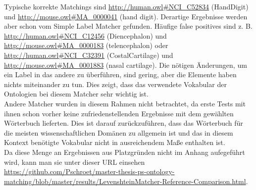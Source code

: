 		Typische korrekte Matchings sind \url{http://human.owl#NCI_C52834}
		(Hand\textunderscore Digit) und
		\url{http://mouse.owl#MA_0000041} (hand digit). Derartige Ergebnisse werden
		aber schon vom Simple Label Matcher gefunden. Häufige false positives sind
		z. B. \url{http://human.owl#NCI_C12456} (Diencephalon) und
		\url{http://mouse.owl#MA_0000183} (telencephalon) oder
		\url{http://human.owl#NCI_C32391} (Costal\textunderscore Cartilage) und
		\url{http://mouse.owl#MA_0001883} (nasal cartilage). Die nötigen Änderungen,
		um ein Label in das andere zu überführen, sind gering, aber die Elemente haben
		nichts miteinander zu tun. Dies zeigt, dass das verwendete Vokabular der
		Ontologien bei diesem Matcher sehr wichtig ist.\\
		Andere Matcher wurden in diesem Rahmen nicht betrachtet, da erste Tests mit
		ihnen schon vorher keine zufriedenstellenden Ergebnisse mit dem gewählten
		Wörterbuch lieferten.
		Dies ist darauf zurückzuführen, dass das Wörterbuch für die meisten
		wissenschaftlichen Domänen zu allgemein ist und das in diesem Kontext
		benötigte Vokabular nicht in ausreichendem Maße enthalten ist.\\
		Da diese Menge an Ergebnissen aus Platzgründen nicht im Anhang aufegeführt
		wird, kann man sie unter dieser URL einsehen
		\url{https://github.com/Pschroet/master-thesis-ps-ontology-matching/blob/master/results/LevenshteinMatcher-Reference-Comparison.html}.
		
		\pagebreak[4]